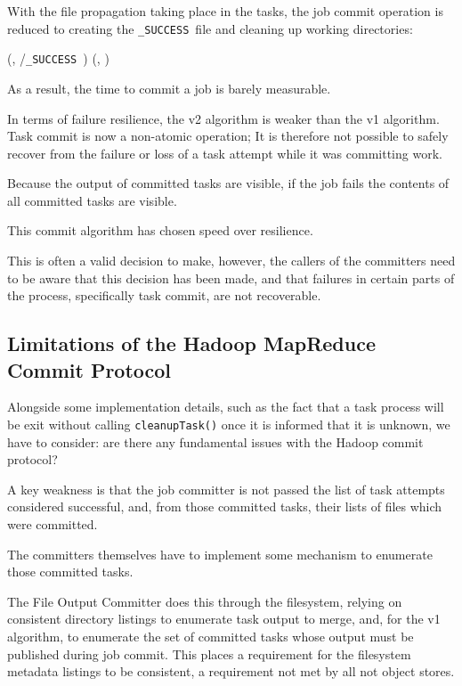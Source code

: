 \documentclass[conference]{IEEEtran}
\newcommand{\SUCCESS}{\texttt{\_SUCCESS}\ }
\begin{document}
With the file propagation taking place in the tasks, the job commit
operation is reduced to creating the \SUCCESS file and cleaning up
working directories:

\begin{procedure*}
\FileOutputCommitVars

  \touch(\fs, \dest/\SUCCESS)\;
  \delete(\fs, \temp)\;

\label{alg:commitJobV2}

\caption{v2 commitJob()}
\end{procedure*}

As a result, the time to commit a job is barely measurable.

In terms of failure resilience, the v2 algorithm is weaker than the v1 algorithm.
Task commit is now a non-atomic operation;
It is therefore not possible to safely recover from the failure or loss of a task attempt
while it was committing work.

Because the output of committed tasks are visible,
if the job fails the contents of all committed tasks are visible.

This commit algorithm has chosen speed over resilience.

This is often a valid decision to make, however, the callers of the committers
need to be aware that this decision has been made, and that failures in
certain parts of the process, specifically task commit, are not recoverable.

\subsection{Limitations of the Hadoop MapReduce Commit Protocol}
\label{subsec:hadoop-commit-protocol}

Alongside some implementation details, such as the fact that a task process
will be exit without calling \texttt{cleanupTask()} once it is informed that it
is unknown, we have to consider: are there any fundamental issues with
the Hadoop commit protocol?

A key weakness is that the job committer is not passed the list of task
attempts considered successful, and, from those committed tasks, their
lists of files which were committed.

The committers themselves have to implement some mechanism to enumerate those
committed tasks.

The File Output Committer does this through the filesystem, relying on consistent
directory listings to enumerate task output to merge, and, for the v1 algorithm,
to enumerate the set of committed tasks whose output must be published during job commit.
This places a requirement for the filesystem metadata listings to be consistent,
a requirement not met by all not object stores.
\end{document}
